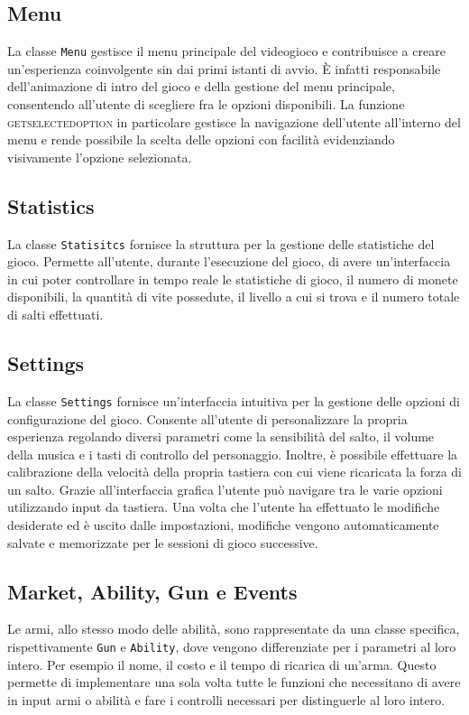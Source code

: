 \documentclass[a4paper]{article}
\begin{document}
\subsection{Menu}
La classe \texttt{Menu} gestisce il menu principale del videogioco e 
contribuisce a creare un’esperienza coinvolgente sin dai primi istanti di avvio. 
È infatti responsabile dell’animazione di intro del gioco e della gestione del 
menu principale, consentendo all’utente di scegliere fra le opzioni disponibili.
La funzione \textsc{getselectedoption} in particolare gestisce la navigazione 
dell’utente all’interno del menu e rende possibile la scelta delle opzioni con 
facilità evidenziando visivamente l’opzione selezionata. 


\subsection{Statistics}
La classe \texttt{Statisitcs} fornisce la struttura per la gestione delle 
statistiche del gioco. Permette all’utente, durante l’esecuzione del gioco, di 
avere un’interfaccia in cui poter controllare in tempo reale le statistiche di 
gioco, il numero di monete disponibili, la quantità di vite possedute, il 
livello a cui si trova e il numero totale di salti effettuati.

\subsection{Settings}
La classe \texttt{Settings} fornisce un'interfaccia intuitiva per la gestione 
delle opzioni di configurazione del gioco. Consente all’utente di personalizzare 
la propria esperienza regolando diversi parametri come la sensibilità del salto, 
il volume della musica e i tasti di controllo del personaggio. Inoltre, è 
possibile effettuare la calibrazione della velocità della propria tastiera con 
cui viene ricaricata la forza di un salto. Grazie all’interfaccia grafica 
l’utente può navigare tra le varie opzioni utilizzando input da tastiera. Una 
volta che l’utente ha effettuato le modifiche desiderate ed è uscito dalle 
impostazioni, modifiche vengono automaticamente salvate e memorizzate per le 
sessioni di gioco successive.

\subsection{Market, Ability, Gun e Events}
Le armi, allo stesso modo delle abilità, sono rappresentate da una classe 
specifica, rispettivamente \texttt{Gun} e \texttt{Ability}, dove vengono
differenziate per i parametri al loro intero. Per esempio il nome, il costo e il 
tempo di ricarica di un'arma. Questo permette di implementare una sola volta 
tutte le funzioni che necessitano di avere in input armi o abilità e fare i 
controlli necessari per distinguerle al loro intero.
\end{document}
